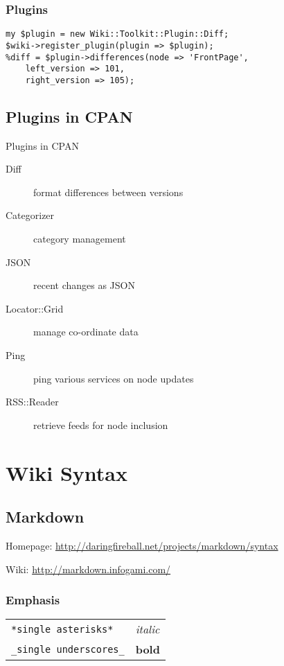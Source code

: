 
\begin{frame}[fragile]
\frametitle{Plugins}
\begin{lstlisting}
my $plugin = new Wiki::Toolkit::Plugin::Diff;
$wiki->register_plugin(plugin => $plugin);
%diff = $plugin->differences(node => 'FrontPage',
    left_version => 101,
    right_version => 105);
\end{lstlisting}
\end{frame}

\subsection{Plugins in CPAN}

\begin{frame}{Plugins in CPAN}
 \begin{description}
  \item[Diff] format differences between versions
  \item[Categorizer] category management
  \item[JSON] recent changes as JSON
  \item[Locator::Grid] manage co-ordinate data
  \item[Ping] ping various services on node updates
  \item[RSS::Reader] retrieve feeds for node inclusion
 \end{description}
\end{frame}

\section{Wiki Syntax}
\subsection{Markdown}
Homepage: \url{http://daringfireball.net/projects/markdown/syntax}

Wiki: \url{http://markdown.infogami.com/}

\subsubsection{Emphasis}

\begin{tabular}{ll}
\verb|*single asterisks*| & \textit{italic} \\
\verb|_single underscores_| & \textbf{bold} \\
\end{tabular}

